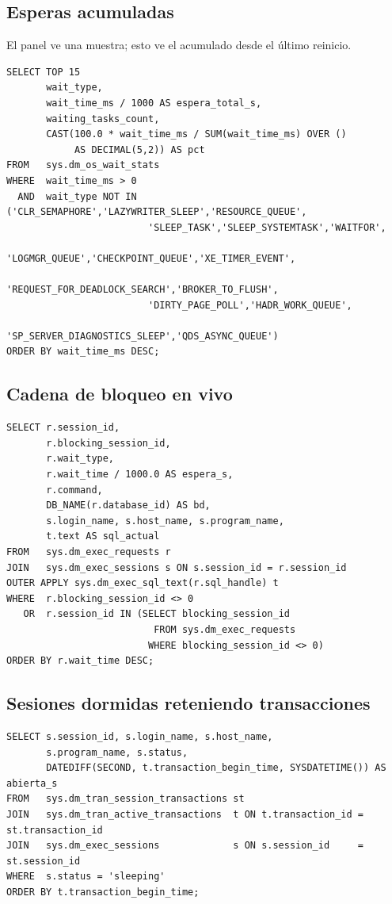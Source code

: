 \documentclass[11pt,a4paper]{article}
\begin{document}
\subsection{Esperas acumuladas}

El panel ve una muestra; esto ve el acumulado desde el último reinicio.

\begin{lstlisting}[style=sql]
SELECT TOP 15
       wait_type,
       wait_time_ms / 1000 AS espera_total_s,
       waiting_tasks_count,
       CAST(100.0 * wait_time_ms / SUM(wait_time_ms) OVER ()
            AS DECIMAL(5,2)) AS pct
FROM   sys.dm_os_wait_stats
WHERE  wait_time_ms > 0
  AND  wait_type NOT IN ('CLR_SEMAPHORE','LAZYWRITER_SLEEP','RESOURCE_QUEUE',
                         'SLEEP_TASK','SLEEP_SYSTEMTASK','WAITFOR',
                         'LOGMGR_QUEUE','CHECKPOINT_QUEUE','XE_TIMER_EVENT',
                         'REQUEST_FOR_DEADLOCK_SEARCH','BROKER_TO_FLUSH',
                         'DIRTY_PAGE_POLL','HADR_WORK_QUEUE',
                         'SP_SERVER_DIAGNOSTICS_SLEEP','QDS_ASYNC_QUEUE')
ORDER BY wait_time_ms DESC;
\end{lstlisting}

\subsection{Cadena de bloqueo en vivo}

\begin{lstlisting}[style=sql]
SELECT r.session_id,
       r.blocking_session_id,
       r.wait_type,
       r.wait_time / 1000.0 AS espera_s,
       r.command,
       DB_NAME(r.database_id) AS bd,
       s.login_name, s.host_name, s.program_name,
       t.text AS sql_actual
FROM   sys.dm_exec_requests r
JOIN   sys.dm_exec_sessions s ON s.session_id = r.session_id
OUTER APPLY sys.dm_exec_sql_text(r.sql_handle) t
WHERE  r.blocking_session_id <> 0
   OR  r.session_id IN (SELECT blocking_session_id
                          FROM sys.dm_exec_requests
                         WHERE blocking_session_id <> 0)
ORDER BY r.wait_time DESC;
\end{lstlisting}

\subsection{Sesiones dormidas reteniendo transacciones}

\begin{lstlisting}[style=sql]
SELECT s.session_id, s.login_name, s.host_name,
       s.program_name, s.status,
       DATEDIFF(SECOND, t.transaction_begin_time, SYSDATETIME()) AS abierta_s
FROM   sys.dm_tran_session_transactions st
JOIN   sys.dm_tran_active_transactions  t ON t.transaction_id = st.transaction_id
JOIN   sys.dm_exec_sessions             s ON s.session_id     = st.session_id
WHERE  s.status = 'sleeping'
ORDER BY t.transaction_begin_time;
\end{lstlisting}
\end{document}
